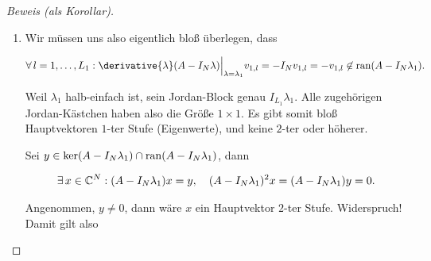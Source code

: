 \begin{proof}[Beweis (als Korollar)]
\begin{enumerate}[label = \arabic*.]
\begin{comment}
            \begin{align*}
                \implies
                (A \hat v_1, \dots, A \hat v_{L_1}, \ast)
                =
                A T
                \stackrel
                {
                    \text{JNF}
                }{=}
                T J
                =
                (\hat v_1, \dots, \hat v_{L_1}, \ast)
                \underbrace
                {
                    \begin{pmatrix}
                        J_1 & 0 \\
                        0   & \ast
                    \end{pmatrix}
                }_J
                =
                (\lambda_1 \hat v_1, \dots, \lambda_1 \hat v_{L_1}, \ast)
            \end{align*}
        
            Wir können die linear unabhängig $\hat v_1, \dots, v_{L_1}$ also orthonormalisieren (Gram-Schmidt) und erhalten die Orthonormalbasis $V_1 := (v_{1, 1}, \dots, v_{1, L_1})$.

        \end{comment}

        \item Wir müssen uns also eigentlich bloß überlegen, dass

        \begin{align*}
            \Forall l = 1, \dots, L_1:
                \derivative{\lambda} (A - I_N \lambda) \Big |_{\lambda = \lambda_1} v_{1, l}
                =
                -I_N v_{1, l}
                =
                -v_{1, l}
                \not \in
                \ran (A - I_N \lambda_1).
        \end{align*}

        Weil $\lambda_1$ halb-einfach ist, sein Jordan-Block genau $I_{L_1} \lambda_1$.
        Alle zugehörigen Jordan-Kästchen haben also die Größe $1 \times 1$.
        Es gibt somit bloß Hauptvektoren $1$-ter Stufe (Eigenwerte), und keine $2$-ter oder höherer.

        Sei $y \in \ker (A - I_N \lambda_1) \cap \operatorname{ran} (A - I_N \lambda_1)$, dann

        \begin{align*}
            \exists \, x \in \mathbb{C}^N:
                (A - I_N \lambda_1) x = y,
                \quad
                (A - I_N \lambda_1)^2 x = (A - I_N \lambda_1) y = 0.
        \end{align*}

        Angenommen, $y \neq 0$, dann wäre $x$ ein Hauptvektor $2$-ter Stufe.
        Widerspruch!
        Damit gilt also


\end{enumerate}
\end{proof}

